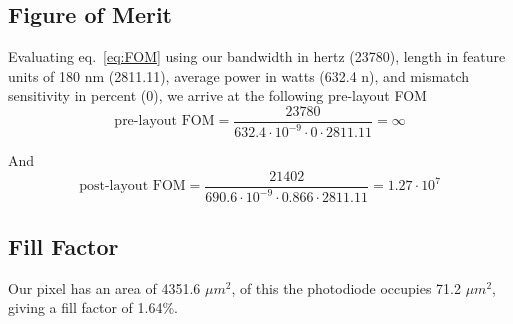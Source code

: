 \subsection{Figure of Merit}
Evaluating eq.~\ref{eq:FOM} using our bandwidth in hertz (23780), length in feature units of 180 nm (2811.11), average power in watts (632.4 n), and 
mismatch sensitivity in percent (0), we arrive at the following pre-layout FOM
\begin{equation*}
    \text{pre-layout FOM} = \frac{23780}{632.4\cdot10^{-9}\cdot0\cdot2811.11} = \infty
\end{equation*}

And
\begin{equation*}
    \text{post-layout FOM} = \frac{21402}{690.6\cdot10^{-9}\cdot0.866\cdot2811.11} = 1.27\cdot10^7
\end{equation*}

\subsection{Fill Factor}
Our pixel has an area of 4351.6 \(\mu m^2\), of this the photodiode occupies 71.2 \(\mu m^2\), giving a fill factor of
1.64\%.
